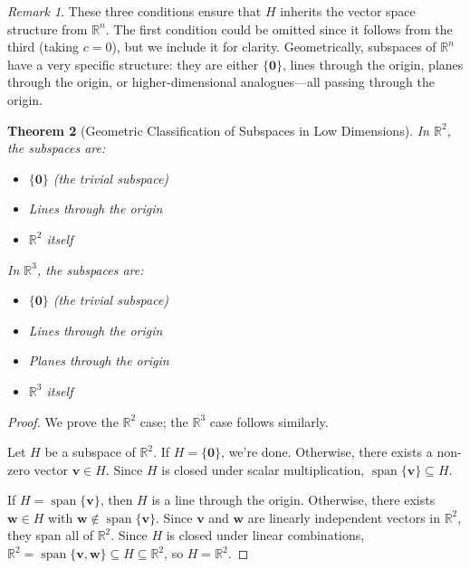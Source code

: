 \documentclass[12pt]{article}
\numberwithin{equation}{section}
\newcommand{\vect}[1]{\boldsymbol{#1}}   %
\newcommand{\Span}{\operatorname{span}}
\theoremstyle{plain}
\newtheorem{theorem}{Theorem}[section]
\theoremstyle{definition}
\theoremstyle{remark}
\newtheorem{remark}[theorem]{Remark}
\begin{document}
\begin{remark}
These three conditions ensure that $H$ inherits the vector space structure from $\mathbb{R}^n$. The first condition could be omitted since it follows from the third (taking $c = 0$), but we include it for clarity. Geometrically, subspaces of $\mathbb{R}^n$ have a very specific structure: they are either $\{\vect{0}\}$, lines through the origin, planes through the origin, or higher-dimensional analogues—all passing through the origin.
\end{remark}

\begin{theorem}[Geometric Classification of Subspaces in Low Dimensions]
In $\mathbb{R}^2$, the subspaces are:
\begin{itemize}
\item $\{\vect{0}\}$ (the trivial subspace)
\item Lines through the origin
\item $\mathbb{R}^2$ itself
\end{itemize}

In $\mathbb{R}^3$, the subspaces are:
\begin{itemize}
\item $\{\vect{0}\}$ (the trivial subspace)
\item Lines through the origin
\item Planes through the origin  
\item $\mathbb{R}^3$ itself
\end{itemize}
\end{theorem}

\begin{proof}
We prove the $\mathbb{R}^2$ case; the $\mathbb{R}^3$ case follows similarly.

Let $H$ be a subspace of $\mathbb{R}^2$. If $H = \{\vect{0}\}$, we're done. Otherwise, there exists a non-zero vector $\vect{v} \in H$. Since $H$ is closed under scalar multiplication, $\Span\{\vect{v}\} \subseteq H$.

If $H = \Span\{\vect{v}\}$, then $H$ is a line through the origin. Otherwise, there exists $\vect{w} \in H$ with $\vect{w} \notin \Span\{\vect{v}\}$. Since $\vect{v}$ and $\vect{w}$ are linearly independent vectors in $\mathbb{R}^2$, they span all of $\mathbb{R}^2$. Since $H$ is closed under linear combinations, $\mathbb{R}^2 = \Span\{\vect{v}, \vect{w}\} \subseteq H \subseteq \mathbb{R}^2$, so $H = \mathbb{R}^2$.
\end{proof}
\end{document}

